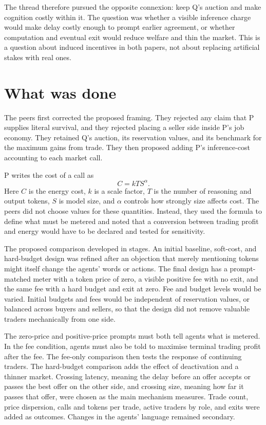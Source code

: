 \documentclass{article}
\begin{document}
The thread therefore pursued the opposite connexion: keep Q's auction and make cognition costly within it.  The question was whether a visible inference charge would make delay costly enough to prompt earlier agreement, or whether computation and eventual exit would reduce welfare and thin the market.  This is a question about induced incentives in both papers, not about replacing artificial stakes with real ones.

\section{What was done}

The peers first corrected the proposed framing.  They rejected any claim that P supplies literal survival, and they rejected placing a seller side inside P's job economy.  They retained Q's auction, its reservation values, and its benchmark for the maximum gains from trade.  They then proposed adding P's inference-cost accounting to each market call.

P writes the cost of a call as
\begin{equation}
 C = k T S^{\alpha}.
\end{equation}
Here $C$ is the energy cost, $k$ is a scale factor, $T$ is the number of reasoning and output tokens, $S$ is model size, and $\alpha$ controls how strongly size affects cost.  The peers did not choose values for these quantities.  Instead, they used the formula to define what must be metered and noted that a conversion between trading profit and energy would have to be declared and tested for sensitivity.

The proposed comparison developed in stages.  An initial baseline, soft-cost, and hard-budget design was refined after an objection that merely mentioning tokens might itself change the agents' words or actions.  The final design has a prompt-matched meter with a token price of zero, a visible positive fee with no exit, and the same fee with a hard budget and exit at zero.  Fee and budget levels would be varied.  Initial budgets and fees would be independent of reservation values, or balanced across buyers and sellers, so that the design did not remove valuable traders mechanically from one side.

The zero-price and positive-price prompts must both tell agents what is metered.  In the fee condition, agents must also be told to maximise terminal trading profit after the fee.  The fee-only comparison then tests the response of continuing traders.  The hard-budget comparison adds the effect of deactivation and a thinner market.  Crossing latency, meaning the delay before an offer accepts or passes the best offer on the other side, and crossing size, meaning how far it passes that offer, were chosen as the main mechanism measures.  Trade count, price dispersion, calls and tokens per trade, active traders by role, and exits were added as outcomes.  Changes in the agents' language remained secondary.
\end{document}
